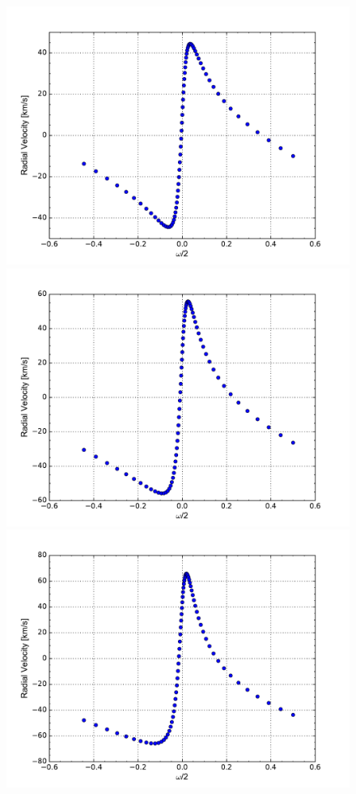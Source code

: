 \documentclass[onecolumn]{aastex6}
\begin{document}
\begin{figure}[ht]
  \includegraphics[scale=0.3]{m.pdf}%
  \includegraphics[scale=0.3]{n.pdf}%
  \includegraphics[scale=0.3]{o.pdf} \\%

\end{figure}
\end{document}
